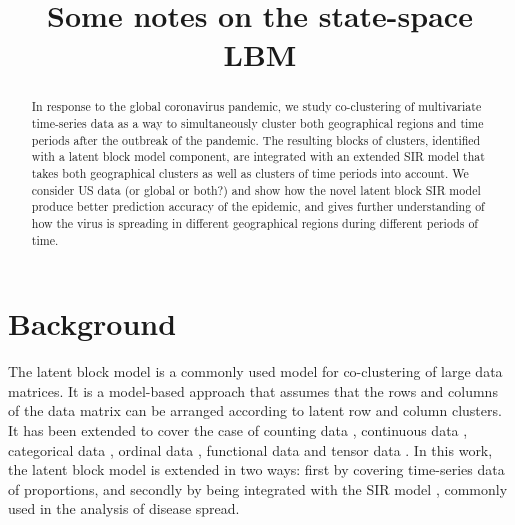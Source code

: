 \documentclass[10pt,a4paper]{article}
\author{}
\date{}
\title{Some notes on the state-space LBM}
\begin{document}
\maketitle


\begin{abstract}
	\noindent In response to the global coronavirus pandemic, we study co-clustering of multivariate time-series data as a way to simultaneously cluster both geographical regions and time periods after the outbreak of the pandemic. The resulting blocks of clusters, identified with a latent block model component, are integrated with an extended SIR model that takes both geographical clusters as well as clusters of time periods into account. We consider US data (or global or both?) and show how the novel latent block SIR model produce better prediction accuracy of the epidemic, and gives further understanding of how the virus is spreading in different geographical regions during different periods of time. 
\end{abstract}	

\section{Background}

The latent block model \parencite{govaert2003clustering} is a commonly used model for co-clustering of large data matrices. It is a model-based approach that assumes that the rows and columns of the data matrix can be arranged according to latent row and column clusters. It has been extended to cover the case of counting data \parencite{govaert2010latent}, continuous data \parencite{nadif2010model}, categorical data \parencite{keribin2015estimation}, ordinal data \parencite{jacques2018model, corneli2020co}, functional data \parencite{Bouveyron}  and tensor data \parencite{boutalbi2020tensor}. In this work, the latent block model is extended in two ways: first by covering time-series data of proportions, and secondly by being integrated with the SIR model \parencite{kermack1927contribution}, commonly used in the analysis of disease spread.
\end{document}
